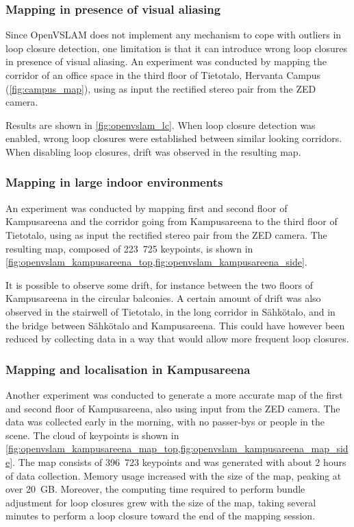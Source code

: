 \documentclass[11pt, letterpaper, twoside]{article}
\begin{document}
\subsubsection{Mapping in presence of visual aliasing}

Since OpenVSLAM does not implement any mechanism to cope with outliers in loop
closure detection, one limitation is that it can introduce wrong loop closures
in presence of visual aliasing. An experiment was conducted by mapping the
corridor of an office space in the third floor of Tietotalo, Hervanta Campus
(\cref{fig:campus_map}), using as input the rectified stereo pair from the ZED
camera.

Results are shown in \cref{fig:openvslam_lc}. When loop closure detection was
enabled, wrong loop closures were established between similar looking
corridors. When disabling loop closures, drift was observed in the resulting
map.

\subsubsection{Mapping in large indoor environments}

An experiment was conducted by mapping first and second floor of Kampusareena
and the corridor going from Kampusareena to the third floor of Tietotalo, using
as input the rectified stereo pair from the ZED camera. The resulting map,
composed of 223~725 keypoints, is shown in
\cref{fig:openvslam_kampusareena_top,fig:openvslam_kampusareena_side}.

It is possible to observe some drift, for instance between the two floors of
Kampusareena in the circular balconies. A certain amount of drift was also
observed in the stairwell of Tietotalo, in the long corridor in Sähkötalo, and
in the bridge between Sähkötalo and Kampusareena. This could have however been
reduced by collecting data in a way that would allow more frequent loop
closures.

\subsubsection{Mapping and localisation in Kampusareena}

Another experiment was conducted to generate a more accurate map of the first
and second floor of Kampusareena, also using input from the ZED camera. The
data was collected early in the morning, with no passer-bys or people in the
scene. The cloud of keypoints is shown in
\cref{fig:openvslam_kampusareena_map_top,fig:openvslam_kampusareena_map_side}.
The map consists of 396~723 keypoints and was generated with about 2 hours of
data collection. Memory usage increased with the size of the map, peaking at
over 20~GB. Moreover, the computing time required to perform bundle adjustment
for loop closures grew with the size of the map, taking several minutes to
perform a loop closure toward the end of the mapping session.
\end{document}
